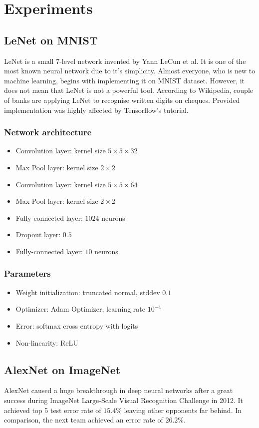 \documentclass[licencjacka]{pracamgr}
\begin{document}
\chapter{Experiments}
	\section{LeNet on MNIST}
		LeNet is a small 7-level network invented by Yann LeCun et al. It is one of the most known neural network due to it’s simplicity. Almost everyone, who is new to machine learning, begins with implementing it on MNIST dataset. However, it does not mean that LeNet is not a powerful tool. According to Wikipedia, couple of banks are applying LeNet to recognise written digits on cheques. Provided implementation was highly affected by Tensorflow's tutorial. \\
		\subsection{Network architecture}
			\begin{itemize}
			\item Convolution layer: kernel size $5 \times 5 \times 32$
			\item Max Pool layer: kernel size $2 \times 2$
			\item Convolution layer: kernel size $5 \times 5 \times 64$
			\item Max Pool layer: kernel size $2 \times 2$
			\item Fully-connected layer: $1024$ neurons
			\item Dropout layer: $0.5$
			\item Fully-connected layer: $10$ neurons
			\end{itemize}
		\subsection{Parameters}
			\begin{itemize}
			\item Weight initialization: truncated normal, stddev $0.1$
			\item Optimizer: Adam Optimizer, learning rate $10^{-4}$
			\item Error: softmax cross entropy with logits
			\item Non-linearity: ReLU
			\end{itemize}
	\section{AlexNet on ImageNet}
	AlexNet caused a huge breakthrough in deep neural networks after a great success during ImageNet Large-Scale Visual Recognition Challenge in 2012. It achieved top 5 test error rate of $15.4\%$ leaving other opponents far behind. In comparison, the next team achieved an error rate of $26.2\%$. 
\end{document}
